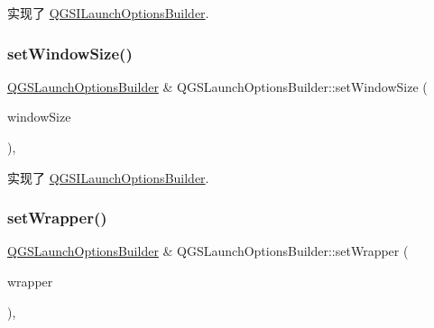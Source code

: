 实现了 \mbox{\hyperlink{class_q_g_s_i_launch_options_builder_adbb11b42b51fa0503ac673e7fc9ad100}{Q\+G\+S\+I\+Launch\+Options\+Builder}}.

\mbox{\label{class_q_g_s_launch_options_builder_a4c7d32950b863301370a8547c2562dfd}} 
\subsubsection{\texorpdfstring{set\+Window\+Size()}{setWindowSize()}}
{\footnotesize\ttfamily \mbox{\hyperlink{class_q_g_s_launch_options_builder}{Q\+G\+S\+Launch\+Options\+Builder}} \& Q\+G\+S\+Launch\+Options\+Builder\+::set\+Window\+Size (\begin{DoxyParamCaption}\item[{const Q\+Size \&}]{window\+Size }\end{DoxyParamCaption})\hspace{0.3cm}{\ttfamily [override]}, {\ttfamily [virtual]}}



实现了 \mbox{\hyperlink{class_q_g_s_i_launch_options_builder_a9ae589d52294839563a4c4b48ecf59da}{Q\+G\+S\+I\+Launch\+Options\+Builder}}.

\mbox{\label{class_q_g_s_launch_options_builder_a0f273717f178f93bb964d34e333110e9}} 
\subsubsection{\texorpdfstring{set\+Wrapper()}{setWrapper()}}
{\footnotesize\ttfamily \mbox{\hyperlink{class_q_g_s_launch_options_builder}{Q\+G\+S\+Launch\+Options\+Builder}} \& Q\+G\+S\+Launch\+Options\+Builder\+::set\+Wrapper (\begin{DoxyParamCaption}\item[{const Q\+String \&}]{wrapper }\end{DoxyParamCaption})\hspace{0.3cm}{\ttfamily [override]}, {\ttfamily [virtual]}}




